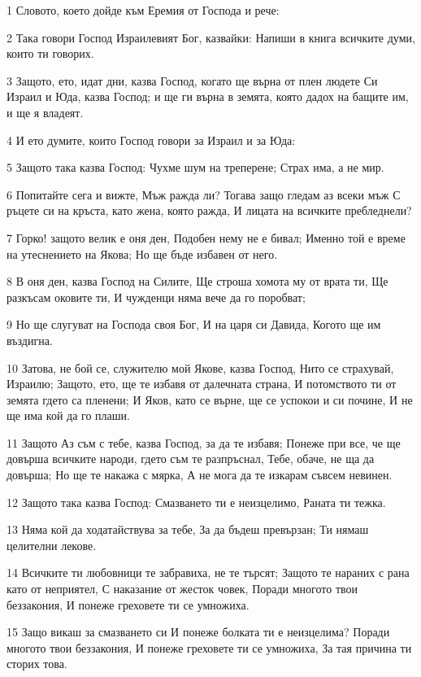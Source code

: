 \par 1 Словото, което дойде към Еремия от Господа и рече:
\par 2 Така говори Господ Израилевият Бог, казвайки: Напиши в книга всичките думи, които ти говорих.
\par 3 Защото, ето, идат дни, казва Господ, когато ще върна от плен людете Си Израил и Юда, казва Господ; и ще ги върна в земята, която дадох на бащите им, и ще я владеят.
\par 4 И ето думите, които Господ говори за Израил и за Юда:
\par 5 Защото така казва Господ: Чухме шум на треперене; Страх има, а не мир.
\par 6 Попитайте сега и вижте, Мъж ражда ли? Тогава защо гледам аз всеки мъж С ръцете си на кръста, като жена, която ражда, И лицата на всичките пребледнели?
\par 7 Горко! защото велик е оня ден, Подобен нему не е бивал; Именно той е време на утеснението на Якова; Но ще бъде избавен от него.
\par 8 В оня ден, казва Господ на Силите, Ще строша хомота му от врата ти, Ще разкъсам оковите ти, И чужденци няма вече да го поробват;
\par 9 Но ще слугуват на Господа своя Бог, И на царя си Давида, Когото ще им въздигна.
\par 10 Затова, не бой се, служителю мой Якове, казва Господ, Нито се страхувай, Израилю; Защото, ето, ще те избавя от далечната страна, И потомството ти от земята гдето са пленени; И Яков, като се върне, ще се успокои и си почине, И не ще има кой да го плаши.
\par 11 Защото Аз съм с тебе, казва Господ, за да те избавя; Понеже при все, че ще довърша всичките народи, гдето съм те разпръснал, Тебе, обаче, не ща да довърша; Но ще те накажа с мярка, А не мога да те изкарам съвсем невинен.
\par 12 Защото така казва Господ: Смазването ти е неизцелимо, Раната ти тежка.
\par 13 Няма кой да ходатайствува за тебе, За да бъдеш превързан; Ти нямаш целителни лекове.
\par 14 Всичките ти любовници те забравиха, не те търсят; Защото те нараних с рана като от неприятел, С наказание от жесток човек, Поради многото твои беззакония, И понеже греховете ти се умножиха.
\par 15 Защо викаш за смазването си И понеже болката ти е неизцелима? Поради многото твои беззакония, И понеже греховете ти се умножиха, За тая причина ти сторих това.
